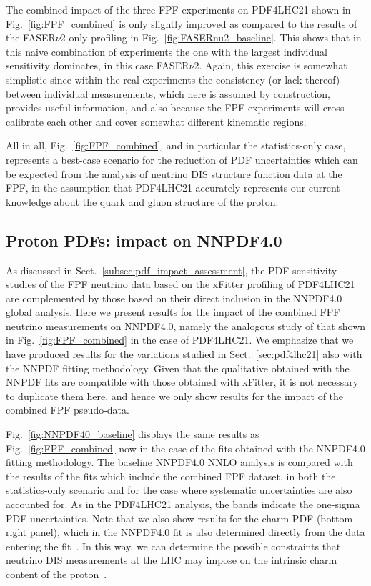 The combined impact of the three FPF experiments on PDF4LHC21 shown in Fig.~\ref{fig:FPF_combined}
is only slightly improved as compared to the results of the FASER$\nu$2-only profiling
in Fig.~\ref{fig:FASERnu2_baseline}.
%
This shows that in this naive combination of experiments the one with the largest individual
sensitivity dominates, in this case FASER$\nu$2.
%
Again, this exercise is somewhat simplistic since within the real experiments the consistency (or lack thereof) between
individual measurements, which here is assumed by construction, provides useful information, and also
because the FPF experiments will cross-calibrate each other and cover somewhat different kinematic regions.

All in all, Fig.~\ref{fig:FPF_combined}, and in particular the statistics-only case, represents
a best-case scenario for the reduction of PDF uncertainties which can be expected from
the analysis of neutrino DIS structure function data at the FPF, in the assumption that PDF4LHC21 accurately represents
our current knowledge about the quark and gluon structure of the proton.

\clearpage

\subsection{Proton PDFs: impact on NNPDF4.0}
\label{sec:nnpdf40}

As discussed in Sect.~\ref{subsec:pdf_impact_assessment}, the PDF sensitivity
studies of the FPF neutrino data based on the {\sc\small xFitter} profiling
of PDF4LHC21 are complemented by those based on their direct inclusion
in the NNPDF4.0 global analysis.
%
Here we present results for the impact of the combined FPF neutrino
measurements on NNPDF4.0, namely the analogous study of that shown
in Fig.~\ref{fig:FPF_combined} in the case of PDF4LHC21.
%
We emphasize that we have produced results for the variations studied in
Sect.~\ref{sec:pdf4lhc21} also with the NNPDF fitting methodology.
%
Given that the qualitative obtained with the NNPDF fits
are compatible with those obtained with {\sc\small xFitter}, it is not necessary to duplicate them here,
and hence we only show results for the impact of the combined FPF pseudo-data.

Fig.~\ref{fig:NNPDF40_baseline} displays the
same results as Fig.~\ref{fig:FPF_combined} now in the case of the
fits obtained with the NNPDF4.0 fitting methodology.
%
The baseline NNPDF4.0 NNLO analysis is compared
with the results of the fits which include the combined FPF dataset,
in both the statistics-only scenario and for the case
where systematic uncertainties are also accounted for.
%
As in the PDF4LHC21 analysis, the bands indicate the one-sigma PDF uncertainties.
%
Note that we also show results for the charm PDF (bottom right panel), which
in the NNPDF4.0 fit is also determined directly from the data entering
the fit~\cite{Ball:2016neh}.
%
In this way, we can determine the possible constraints that neutrino
DIS measurements at the LHC may impose on the intrinsic charm
content of the proton~\cite{Ball:2022qks}.

